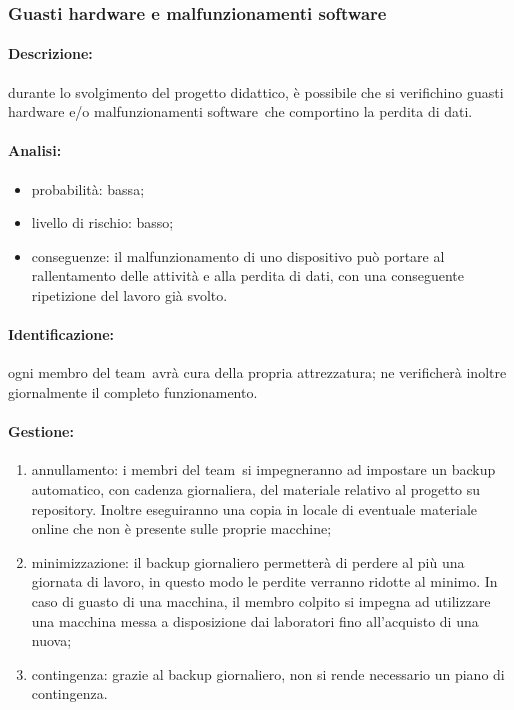 \documentclass[../PianoProgetto.tex]{subfiles}
\begin{document}
	\subsubsection{Guasti hardware e malfunzionamenti software}
	
	\paragraph*{Descrizione:} durante lo svolgimento del progetto didattico, è possibile che si verifichino guasti hardware e/o malfunzionamenti software\g\ che comportino la perdita di dati.
	
	\paragraph*{Analisi:}
	\begin{itemize}
		\item probabilità: bassa;
		\item livello di rischio: basso;
		\item conseguenze: il malfunzionamento di uno dispositivo può portare al rallentamento delle attività e alla perdita di dati, con una conseguente ripetizione del lavoro già svolto.
	\end{itemize}
	
	\paragraph*{Identificazione:} ogni membro del team\g\ avrà cura della propria attrezzatura; ne verificherà inoltre giornalmente il completo funzionamento.
	
	\paragraph*{Gestione:}
	\begin{enumerate}
		\item annullamento: i membri del team\g\ si impegneranno ad impostare un backup automatico, con cadenza giornaliera, del materiale relativo al progetto su repository\g . Inoltre eseguiranno una copia in locale di eventuale materiale online che non è presente sulle proprie macchine;
		\item minimizzazione: il backup giornaliero permetterà di perdere al più una giornata di lavoro, in questo modo le perdite verranno ridotte al minimo. In caso di guasto di una macchina, il membro colpito si impegna ad utilizzare una macchina messa a disposizione dai laboratori fino all'acquisto di una nuova;
		\item contingenza: grazie al backup giornaliero, non si rende necessario un piano di contingenza.
	\end{enumerate} 	
	
\end{document}

